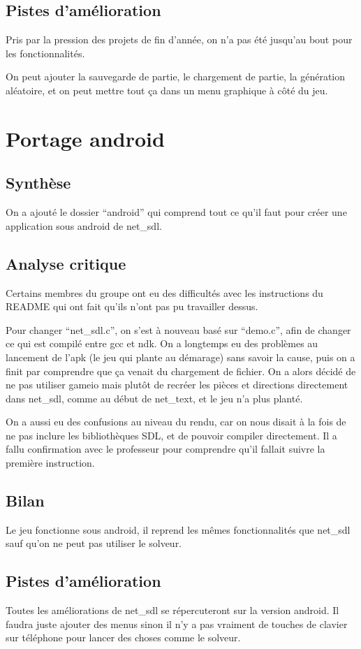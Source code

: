 \documentclass[12pt]{article}
\begin{document}
\subsection{Pistes d'amélioration}
Pris par la pression des projets de fin d'année, on n'a pas été jusqu'au bout pour les fonctionnalités.

On peut ajouter la sauvegarde de partie, le chargement de partie, la génération aléatoire, et on peut mettre tout ça dans un menu graphique à côté du jeu.



\section{Portage android}
\subsection{Synthèse}
On a ajouté le dossier ``android'' qui comprend tout ce qu'il faut pour créer une application sous android de net\_sdl.
\subsection{Analyse critique}
Certains membres du groupe ont eu des difficultés avec les instructions du README qui ont fait qu'ils n'ont pas pu travailler dessus.

Pour changer ``net\_sdl.c'', on s'est à nouveau basé sur ``demo.c'', afin de changer ce qui est compilé entre gcc et ndk. On a longtemps eu des problèmes au lancement de l'apk (le jeu qui plante au démarage) sans savoir la cause, puis on a finit par comprendre que ça venait du chargement de fichier. On a alors décidé de ne pas utiliser gameio mais plutôt de recréer les pièces et directions directement dans net\_sdl, comme au début de net\_text, et le jeu n'a plus planté.

On a aussi eu des confusions au niveau du rendu, car on nous disait à la fois de ne pas inclure les bibliothèques SDL, et de pouvoir compiler directement. Il a fallu confirmation avec le professeur pour comprendre qu'il fallait suivre la première instruction.
\subsection{Bilan}
Le jeu fonctionne sous android, il reprend les mêmes fonctionnalités que net\_sdl sauf qu'on ne peut pas utiliser le solveur.
\subsection{Pistes d'amélioration}
Toutes les améliorations de net\_sdl se répercuteront sur la version android. Il faudra juste ajouter des menus sinon il n'y a pas vraiment de touches de clavier sur téléphone pour lancer des choses comme le solveur.
\end{document}
